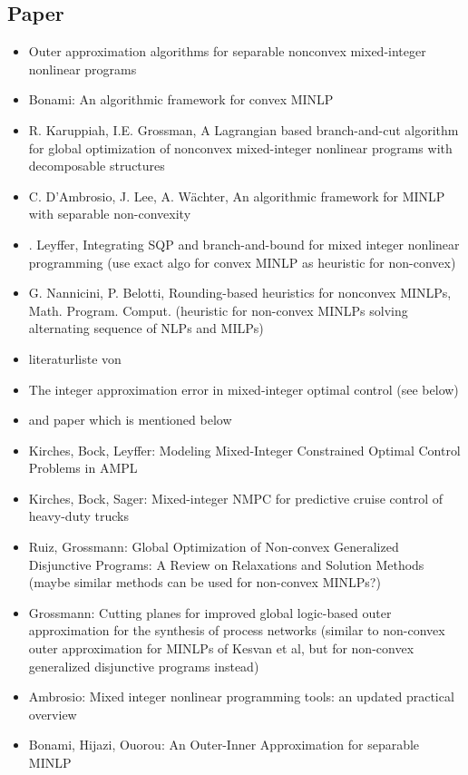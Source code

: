 \documentclass{article}
\begin{document}
\subsection{Paper}
\begin{itemize}
\item Outer approximation algorithms for separable nonconvex mixed-integer nonlinear programs
\item Bonami: An algorithmic framework for convex MINLP
\item R. Karuppiah, I.E. Grossman, A Lagrangian based branch-and-cut algorithm
for global optimization of nonconvex mixed-integer nonlinear programs
with decomposable structures
\item C. D’Ambrosio, J. Lee, A. W\"achter, An algorithmic framework for MINLP with
separable non-convexity
\item . Leyffer, Integrating SQP and branch-and-bound for mixed integer
nonlinear programming (use exact algo for convex MINLP as heuristic for non-convex)
\item G. Nannicini, P. Belotti, Rounding-based heuristics for nonconvex MINLPs,
Math. Program. Comput. (heuristic for non-convex MINLPs solving alternating sequence of NLPs and MILPs)
\item literaturliste von \cite{burer2012non}
\item The integer approximation error in mixed-integer optimal control (see below)
\item and paper which is mentioned below
\item Kirches, Bock, Leyffer: Modeling Mixed-Integer Constrained
Optimal Control Problems in AMPL
\item Kirches, Bock, Sager: Mixed-integer NMPC for predictive cruise control of heavy-duty trucks
\item Ruiz, Grossmann: Global Optimization of Non-convex Generalized
Disjunctive Programs: A Review on Relaxations and Solution Methods (maybe similar methods can be used for non-convex MINLPs?)
\item Grossmann: Cutting planes for improved global logic-based outer approximation
for the synthesis of process networks (similar to non-convex outer approximation for MINLPs of Kesvan et al, but for non-convex generalized disjunctive programs instead)
\item Ambrosio: Mixed integer nonlinear programming tools: an updated practical overview
\item Bonami, Hijazi, Ouorou: An Outer-Inner Approximation for separable MINLP
\end{itemize}
\end{document}
